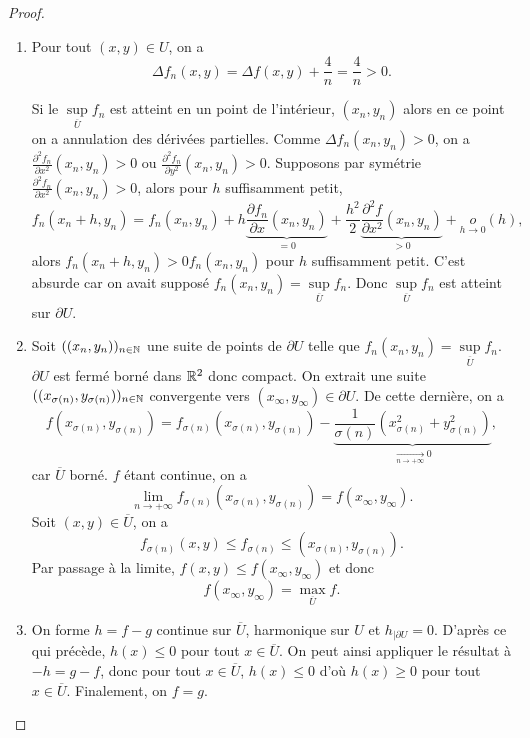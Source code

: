 \documentclass[12pt]{article}
\begin{document}
\begin{proof}
	\phantom{}
	\begin{enumerate}
		\item Pour tout $(x,y)\in U$, on a 
		\begin{equation}
			\Delta f_n(x,y)=\Delta f(x,y)+\frac{4}{n}=\frac{4}{n}>0.
		\end{equation}

		Si le $\sup\limits_{\overline{U}}f_n$ est atteint en un point de l'intérieur, $(x_n,y_n)$ alors en ce point on a annulation des dérivées partielles. Comme $\Delta f_n(x_n,y_n)>0$, on a $\frac{\partial^{2}f_n}{\partial x^{2}}(x_n,y_n)>0$ ou $\frac{\partial^{2}f_n}{\partial y^{2}}(x_n,y_n)>0$. Supposons par symétrie $\frac{\partial^{2}f_n}{\partial x^{2}}(x_n,y_n)>0$, alors pour $h$ suffisamment petit,
		\begin{equation}
			f_n(x_n+h,y_n)=f_n(x_n,y_n)+h\underbrace{\frac{\partial f_n}{\partial x}(x_n,y_n)}_{=0}+\frac{h^{2}}{2}\underbrace{\frac{\partial^{2} f}{\partial x^{2}}(x_n,y_n)}_{>0}+\underset{h\to0}{o}(h),
		\end{equation}
		alors $f_n(x_n+h,y_n)>0f_n(x_n,y_n)$ pour $h$ suffisamment petit. C'est absurde car on avait supposé $f_n(x_n,y_n)=\sup\limits_{\overline{U}}f_n$. Donc $\sup\limits_{\overline{U}}f_n$ est atteint sur $\partial U$.

		\item Soit $((x_n,y_n))_{n\in\mathbb{N}}$ une suite de points de $\partial U$ telle que $f_n(x_n,y_n)=\sup\limits_{\overline{U}}f_n$. $\partial U$ est fermé borné dans $\mathbb{R}^{2}$ donc compact. On extrait une suite $((x_{\sigma(n)},y_{\sigma(n)}))_{n\in\mathbb{N}}$ convergente vers $(x_{\infty},y_{\infty})\in\partial U$. De cette dernière, on a 
		\begin{equation}
			f(x_{\sigma(n)},y_{\sigma(n)})=f_{\sigma(n)}(x_{\sigma(n)},y_{\sigma(n)})-\underbrace{\frac{1}{\sigma(n)}(x_{\sigma(n)}^{2}+y_{\sigma(n)}^{2})}_{\xrightarrow[n\to+\infty]{}0},
		\end{equation}
		car $\overline{U}$ borné. $f$ étant continue, on a 
		\begin{equation}
			\lim\limits_{n\to+\infty}f_{\sigma(n)}(x_{\sigma(n)},y_{\sigma(n)})=f(x_{\infty},y_{\infty}).
		\end{equation}
		Soit $(x,y)\in\overline{U}$, on a 
		\begin{equation}
			f_{\sigma(n)}(x,y)\leqslant f_{\sigma(n)}\leqslant (x_{\sigma(n)},y_{\sigma(n)}).
		\end{equation}
		Par passage à la limite, $f(x,y)\leqslant f(x_{\infty},y_{\infty})$ et donc 
		\begin{equation}
			f(x_{\infty},y_{\infty})=\max\limits_{\overline{U}}f.
		\end{equation}

		\item On forme $h=f-g$ continue sur $\overline{U}$, harmonique sur $U$ et $h_{\mid\partial U}=0$. D'après ce qui précède, $h(x)\leqslant0$ pour tout $x\in\overline{U}$. On peut ainsi appliquer le résultat à $-h=g-f$, donc pour tout $x\in\overline{U}$, $h(x)\leqslant 0$ d'où $h(x)\geqslant0$ pour tout $x\in\overline{U}$. Finalement, on $f=g$.
		\end{enumerate}
\end{proof}
\end{document}
